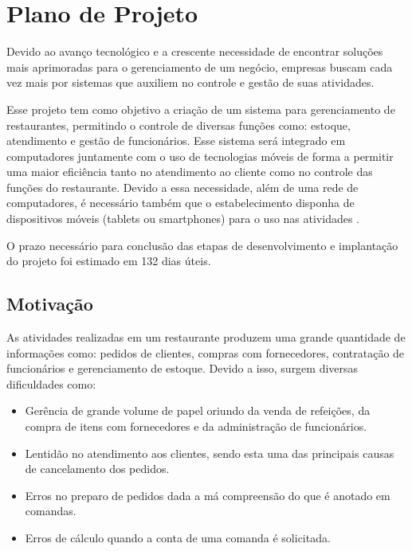 \section{Plano de Projeto}

Devido ao avanço tecnológico e a crescente necessidade de encontrar soluções mais aprimoradas para o gerenciamento de um negócio, empresas buscam cada vez mais por sistemas que auxiliem no controle e gestão de suas atividades.

Esse projeto tem como objetivo a criação de um sistema para gerenciamento de restaurantes, permitindo o controle de diversas funções como: estoque, atendimento e gestão de funcionários. Esse sistema será integrado em computadores juntamente com o uso de tecnologias móveis de forma a permitir uma maior eficiência tanto no atendimento ao cliente como no controle das funções do restaurante. Devido a essa necessidade, além de uma rede de computadores, é necessário também que o estabelecimento disponha de dispositivos móveis (tablets ou smartphones) para o uso nas atividades .

O prazo necessário para conclusão das etapas de desenvolvimento e implantação do projeto foi estimado em 132 dias úteis.

\subsection{Motivação}

As atividades realizadas em um restaurante produzem uma grande quantidade de informações como: pedidos de clientes, compras com fornecedores, contratação de funcionários e gerenciamento de estoque. Devido a isso, surgem diversas dificuldades como:

\begin{itemize}
\item Gerência de grande volume de papel oriundo da venda de refeições, da compra de itens com fornecedores e da administração de funcionários.
\item Lentidão no atendimento aos clientes, sendo esta uma das principais causas de cancelamento dos pedidos.
\item Erros no preparo de pedidos dada a má compreensão do que é anotado em comandas.
\item Erros de cálculo quando a conta de uma comanda é solicitada.
\end{itemize}
